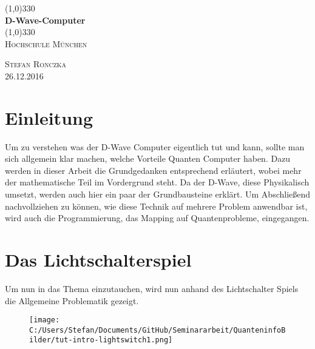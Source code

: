 \documentclass{article}
\begin{document}
\begin{titlepage}
	\begin{center}
	\line(1,0){330} \\
	\vspace{.75 cm}
	\huge{\bfseries D-Wave-Computer}\\
	\vspace{.25 cm}
	\line(1,0){330} \\
	\vspace{1.5 cm}
	\textsc{\LARGE Hochschule M\"unchen}\\
	\vspace{10 cm}
	\end{center}
	\begin{flushright}
	\textsc{\large Stefan Ronczka\\26.12.2016}
	\end{flushright}
\end{titlepage}

\tableofcontents
\thispagestyle{empty}
\cleardoublepage

\setcounter{page}{1}
\section{Einleitung}\label{sec:intro}

Um zu verstehen was der D-Wave Computer eigentlich tut und kann, sollte man sich allgemein klar machen, welche Vorteile Quanten Computer haben.
Dazu werden in dieser Arbeit die Grundgedanken entsprechend erläutert, wobei mehr der mathematische Teil im Vordergrund steht. Da der D-Wave, diese Physikalisch umsetzt, werden auch hier ein paar der Grundbausteine erklärt.
Um Abschließend nachvollziehen zu können, wie diese Technik auf mehrere Problem anwendbar ist, wird auch die Programmierung, das Mapping auf Quantenprobleme, eingegangen.

\section{Das Lichtschalterspiel}\label{sec:historyDWave}

Um nun in das Thema einzutauchen, wird nun anhand des Lichtschalter Spiels
die Allgemeine Problematik gezeigt.	

\begin{figure}[H]
		\centering
\texttt{[image: C:/Users/Stefan/Documents/GitHub/Seminararbeit/QuanteninfoBilder/tut-intro-lightswitch1.png]}

\end{figure}
\end{document}
